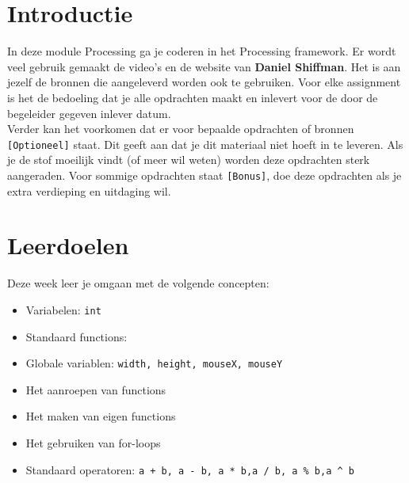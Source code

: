 \newcommand{\tttt}{Sneeuwpop}
\newcommand{\dddd}{Datum 1}



\section{Introductie}
In deze module Processing ga je coderen in het Processing framework. Er wordt veel gebruik gemaakt de video's en de website van \textbf{Daniel Shiffman}. Het is aan jezelf de bronnen die aangeleverd worden ook te gebruiken. Voor elke assignment is het de bedoeling dat je alle opdrachten maakt en inlevert voor de door de begeleider gegeven inlever datum.\\
Verder kan het voorkomen dat er voor bepaalde opdrachten of bronnen \texttt{[Optioneel]} staat. Dit geeft aan dat je dit materiaal niet hoeft in te leveren. Als je de stof moeilijk vindt (of meer wil weten) worden deze opdrachten sterk aangeraden.
Voor sommige opdrachten staat \texttt{[Bonus]}, doe deze opdrachten als je extra verdieping en uitdaging wil.

\section{Leerdoelen}
Deze week leer je omgaan met de volgende concepten:
\begin{itemize}
    \item Variabelen: \texttt{int}
    \item Standaard functions: 
	\item Globale variablen: \texttt{width, height, mouseX, mouseY}     
    \item Het aanroepen van functions
    \item Het maken van eigen functions
    \item Het gebruiken van for-loops
    \item Standaard operatoren: \texttt{a + b, a - b, a * b,a / b, a \% b,a \textasciicircum{} b}
\end{itemize}

